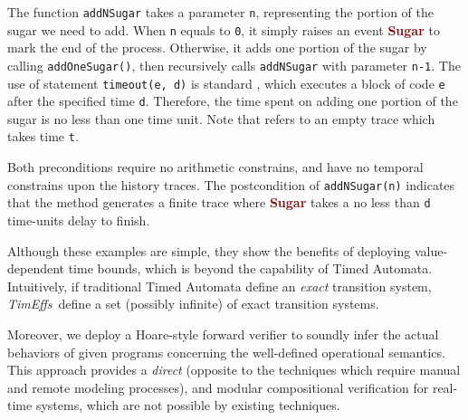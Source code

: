 \documentclass[acmsmall,10pt,review]{acmart}
\newcommand{\codem}[1]{{\lstinline[basicstyle=\small\ttfamily]|#1|}}
\newcommand{\timedEffects}{\emph{TimEffs}}
\newcommand{\effect}{{\ensuremath{\mathrm{\Phi}}}}
\newcommand{\anyevent}[1]{{\textcolor{darkred}
{{\textbf{\footnotesize #1}}}}}
\newcommand{\code}[1]{{\tt{\ensuremath{\m{#1}}}}}
\newcommand{\m}{\mathit}
\newcommand{\mysharp}{{\mathrel{\texttt{\#}}}}
\def\defeq{\ensuremath{\,\triangleq}}
\begin{document}
The function \codem{addNSugar} takes a parameter \codem{n}, representing 
the portion of the sugar we need to add. When \codem{n} 
equals to \codem{0}, 
it simply raises an event \anyevent{Sugar} to mark the end of the process. 
Otherwise, it adds one portion of the sugar by calling
\codem{addOneSugar()}, then recursively calls 
\codem{addNSugar} with parameter \codem{n-1}. 
The use of statement \lstinline|timeout(e, d)| is standard \cite{JSTO}, 
which executes a block of code \codem{e} after the specified time \codem{d}.
Therefore, the time spent on adding one portion of the sugar is 
no less than one time unit. Note that {\color{darklavender}\code{\emph{emp\#t}}} 
refers to an empty trace which takes time \codem{t}. 

Both preconditions require no arithmetic constrains,   
and  have no temporal constrains upon 
the history traces. 
The postcondition of \codem{addNSugar(n)} indicates that  the method 
generates a finite trace where \anyevent{Sugar} takes a no 
less 
than \codem{d} time-units delay to finish. 

Although these examples are simple, they show the benefits of deploying 
value-dependent 
time bounds, which is beyond the capability of Timed Automata. Intuitively, if traditional Timed Automata define an 
\emph{exact} transition system, \timedEffects\ define 
a set (possibly infinite) of exact transition systems. 


Moreover, we deploy a Hoare-style forward verifier to 
soundly infer the actual behaviors of given programs 
concerning the well-defined operational semantics. 
This approach provides a 
\emph{direct} (opposite to the techniques which require 
 manual and remote modeling processes), 
  and modular compositional 
verification for real-time systems, which are not possible
by existing techniques. 




   

\end{document}
